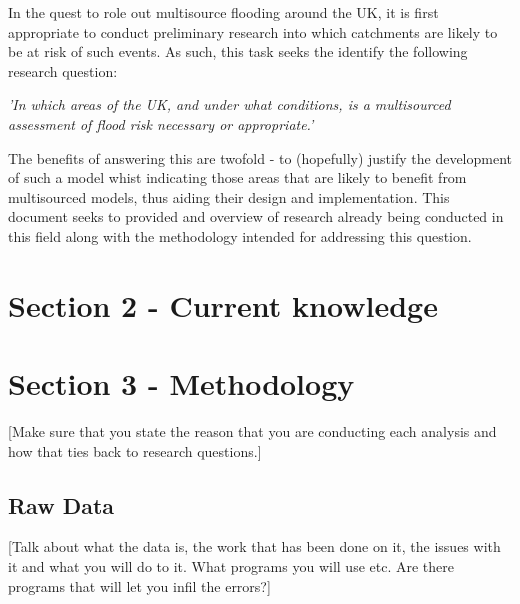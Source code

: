 \documentclass[DIV=calc, paper=a4, fontsize=11pt, twocolumn]{scrartcl}	 %
\begin{document}
In the quest to role out multisource flooding around the UK, it is first appropriate to conduct preliminary research into which catchments are likely to be at risk of such events. As such, this task seeks the identify the following research question:
\begin{center}
	\textit{'In which areas of the UK, and under what conditions, is a multisourced assessment of flood risk necessary or appropriate.'}
\end{center}
The benefits of answering this are twofold - to (hopefully) justify the development of such a model whist indicating those areas that are likely to benefit from multisourced models, thus aiding their design and implementation. This document seeks to provided and overview of research already being conducted in this field along with the methodology intended for  addressing this question.


\section*{Section 2 - Current knowledge}


\section*{Section 3 - Methodology}
[Make sure that you state the reason that you are conducting each analysis and how that ties back to research questions.]\\

	\subsection*{Raw Data}
[Talk about what the data is, the work that has been done on it, the issues with it and what you will do to it. What programs you will use etc. Are there programs that will let you infil the errors?]\\
\end{document}

